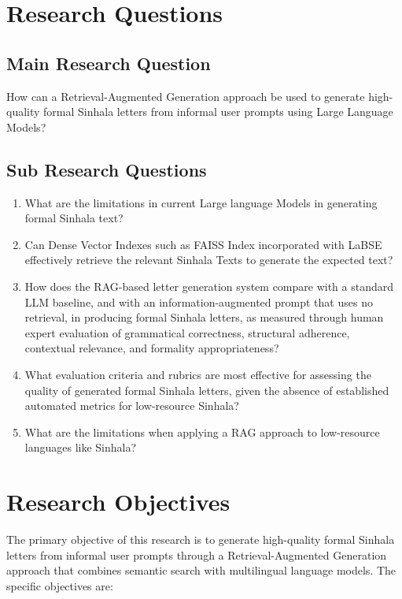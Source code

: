 \documentclass[12pt]{uomthesis}
\begin{document}
\section{Research Questions}
\subsection{Main Research Question}
How can a Retrieval-Augmented Generation approach be used to generate high-quality formal Sinhala letters from informal user prompts using Large Language Models?

\subsection{Sub Research Questions}
\begin{enumerate}
    \item What are the limitations in current Large language Models in generating formal Sinhala text?
    \item Can Dense Vector Indexes such as FAISS Index incorporated with LaBSE effectively retrieve the relevant Sinhala Texts to generate the expected text?
    \item How does the RAG-based letter generation system compare with a standard LLM baseline, and with an information-augmented prompt that uses no retrieval, in producing formal Sinhala letters, as measured through human expert evaluation of grammatical correctness, structural adherence, contextual relevance, and formality appropriateness?
    \item What evaluation criteria and rubrics are most effective for assessing the quality of generated formal Sinhala letters, given the absence of established automated metrics for low-resource Sinhala?
    \item What are the limitations when applying a RAG approach to low-resource languages like Sinhala?
\end{enumerate}

\section{Research Objectives}

The primary objective of this research is to generate high-quality formal Sinhala letters from informal user prompts through a Retrieval-Augmented Generation approach that combines semantic search with multilingual language models. The specific objectives are:
\end{document}
